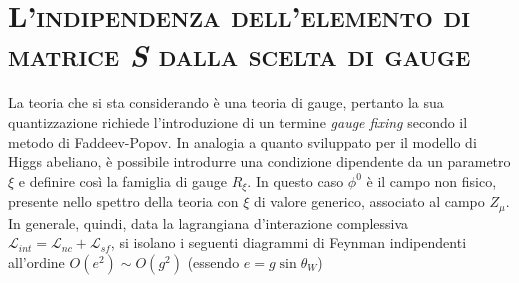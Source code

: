 \documentclass[11pt]{article}
\begin{document}
    \section{\centering\textsc{L'indipendenza dell'elemento di matrice \textit{S} dalla scelta di gauge} } %
    La teoria che si sta considerando è una teoria di gauge, pertanto la sua quantizzazione richiede l'introduzione di un termine \textit{gauge fixing} secondo il metodo di Faddeev-Popov. In analogia a quanto sviluppato per il modello di Higgs abeliano,
    è possibile introdurre una condizione dipendente da un parametro $\xi$ e definire così la famiglia di gauge $R_\xi$. In questo caso $\phi^0$ è il campo non fisico, presente nello spettro della teoria con $\xi$ di valore generico, associato al campo $Z_\mu$.
    In generale, quindi, data la lagrangiana d'interazione complessiva $\mathcal{L}_{int}=\mathcal{L}_{nc}+\mathcal{L}_{sf}$, si isolano i seguenti diagrammi di Feynman indipendenti all'ordine $O(e^2)\sim O(g^2)$ (essendo $e=g\sin\theta_W$)
\end{document}
